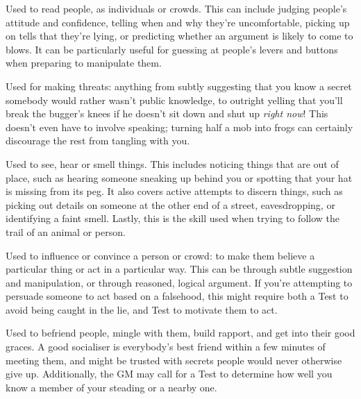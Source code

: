 
Used to read people, as individuals or crowds.
This can include judging people's attitude and confidence, telling when and why they're uncomfortable, picking up on tells that they're lying, or predicting whether an argument is likely to come to blows.
It can be particularly useful for guessing at people's levers and buttons when preparing to manipulate them.


Used for making threats: anything from subtly suggesting that you know a secret somebody would rather wasn't public knowledge, to outright yelling that you'll break the bugger's knees if he doesn't sit down and shut up \emph{right now}!
This doesn't even have to involve speaking; turning half a mob into frogs can certainly discourage the rest from tangling with you.


Used to see, hear or smell things.
This includes noticing things that are out of place, such as hearing someone sneaking up behind you or spotting that your hat is missing from its peg.
It also covers active attempts to discern things, such as picking out details on someone at the other end of a street, eavesdropping, or identifying a faint smell.
Lastly, this is the skill used when trying to follow the trail of an animal or person.


Used to influence or convince a person or crowd: to make them believe a particular thing or act in a particular way.
This can be through subtle suggestion and manipulation, or through reasoned, logical argument.
If you're attempting to persuade someone to act based on a falsehood, this might require both a  Test to avoid being caught in the lie, and  Test to motivate them to act.


Used to befriend people, mingle with them, build rapport, and get into their good graces.
A good socialiser is everybody's best friend within a few minutes of meeting them, and might be trusted with secrets people would never otherwise give up.
Additionally, the GM may call for a  Test to determine how well you know a member of your steading or a nearby one.


